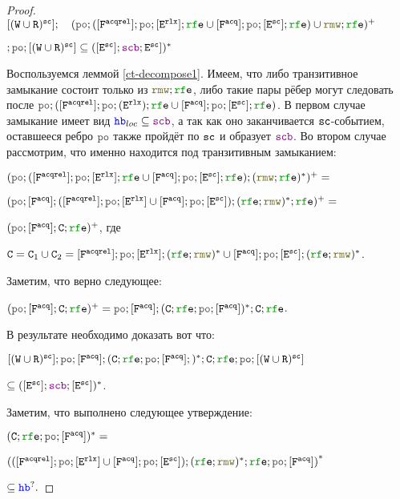 \begin{proof}
  $[(\lW \cup \lR)^{\sco}] ; \quad (\lPO ; ([\Far] ; \lPO ; [\lE^{\rlx}] ; \lRFE \cup [\Fa] ; \lPO ; [\lE^{\sco}] ; \lRFE) \cup \lRMW ; \lRFE)^{+}$
  
  $; \lPO ; [(\lW \cup \lR)^{\sco}] \subseteq  ([\lE^{\sco}] ; \lSCB ;\lE^{\sco}])^{*}$

  Воспользуемся леммой \ref{ct-decompose1}. Имеем, что либо транзитивное замыкание состоит только из $\lRMW ; \lRFE$, либо такие пары рёбер могут следовать после $\lPO ; ([\Far] ; \lPO ; (\lE^{\rlx}) ; \lRFE \cup [\Fa] ; \lPO ; [\lE^{\sco}] ; \lRFE)$. В первом случае замыкание имеет вид $\lHB_{loc} \subseteq \lSCB$, а так как оно заканчивается ${\mathtt{sc}}$-событием, оставшееся ребро $\lPO$ также пройдёт по ${\mathtt{sc}}$ и образует $\lSCB$. Во втором случае рассмотрим, что именно находится под транзитивным замыканием:

  \newcommand{\CA}{\mathtt{C}}

  $(\lPO ; ([\Far] ; \lPO ; [\lE^{\rlx}] ; \lRFE \cup [\Fa] ; \lPO ; [\lE^{\sco}] ; \lRFE) ; (\lRMW ; \lRFE)^{*})^{+} =$

  $(\lPO ; [\Fa] ;([\Far] ; \lPO ; [\lE^{\rlx}] \cup [\Fa] ; \lPO ; [\lE^{\sco}]) ; (\lRFE ; \lRMW)^{*}; \lRFE)^{+} = $

  $(\lPO ; [\Fa]; \CA; \lRFE)^{+}$, где 

  $\CA=\CA_1 \cup \CA_2 = [\Far] ; \lPO ; [\lE^{\rlx}] ; (\lRFE ; \lRMW)^{*} \cup [\Fa] ; \lPO ; [\lE^{\sco}] ; (\lRFE ; \lRMW)^{*}$.

  \newcommand{\canceloffset}{\hspace{-0.78cm}}
  \canceloffset Заметим, что верно следующее: 
  
  $(\lPO ; [\Fa]; \CA; \lRFE)^{+}=\lPO ; [\Fa]; (\CA; \lRFE; \lPO ; [\Fa])^{*}; \CA; \lRFE$.

  \canceloffset В результате необходимо доказать вот что: 

  $[(\lW \cup \lR)^{\sco}] ; \lPO ; [\Fa]; (\CA; \lRFE; \lPO ; [\Fa];)^{*}; \CA; \lRFE; \lPO ; [(\lW \cup \lR)^{\sco}] $

  $\subseteq  ([\lE^{\sco}] ; \lSCB ; [\lE^{\sco}])^{*}$. 

  \canceloffset Заметим, что выполнено следующее утверждение:

  $(\CA; \lRFE; \lPO ; [\Fa])^{*} = $

  $\left(([\Far] ; \lPO ; [\lE^{\rlx}] \cup [\Fa] ; \lPO ; [\lE^{\sco}]) ; (\lRFE ; \lRMW)^{*}; \lRFE; \lPO ; [\Fa] \right)^{*} $

  $\subseteq \lHB^?.$
  

\end{proof}
